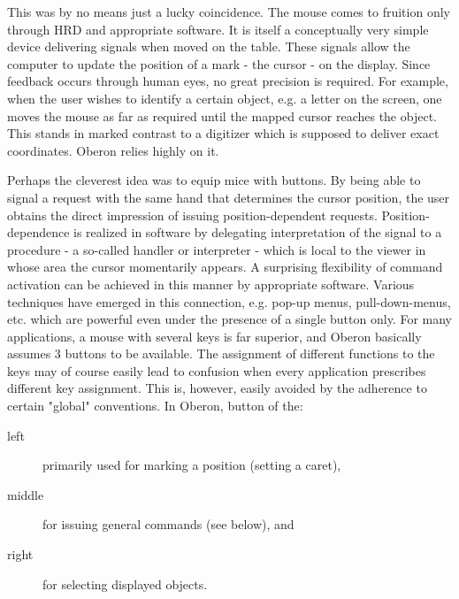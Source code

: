 This was by no means just a lucky coincidence. The mouse comes to fruition only through
HRD and appropriate software. It is itself a conceptually very simple device delivering
signals when moved on the table. These signals allow the computer to update the position of
a mark - the cursor - on the display. Since feedback occurs through human eyes, no great
precision is required. For example, when the user wishes to identify a certain object, e.g.
a letter on the screen, one moves the mouse as far as required until the mapped cursor
reaches the object. This stands in marked contrast to a digitizer which is supposed to
deliver exact coordinates. Oberon relies highly on it.

Perhaps the cleverest idea was to equip mice with buttons. By being able to signal a request
with the same hand that determines the cursor position, the user obtains the direct impression
of issuing position-dependent requests. Position-dependence is realized in software by
delegating interpretation of the signal to a procedure - a so-called handler or interpreter
- which is local to the viewer in whose area the cursor momentarily appears. A surprising
flexibility of command activation can be achieved in this manner by appropriate software.
Various techniques have emerged in this connection, e.g. pop-up menus, pull-down-menus, etc.
which are powerful even under the presence of a single button only. For many applications,
a mouse with several keys is far superior, and Oberon basically assumes 3 buttons to be
available. The assignment of different functions to the keys may of course easily lead to
confusion when every application prescribes different key assignment. This is, however,
easily avoided by the adherence to certain "global" conventions. In Oberon, button of the:
\begin{description}
  \item[left] primarily used for marking a position (setting a caret),
  \item[middle] for issuing general commands (see below), and
  \item[right] for selecting displayed objects.
\end{description}

